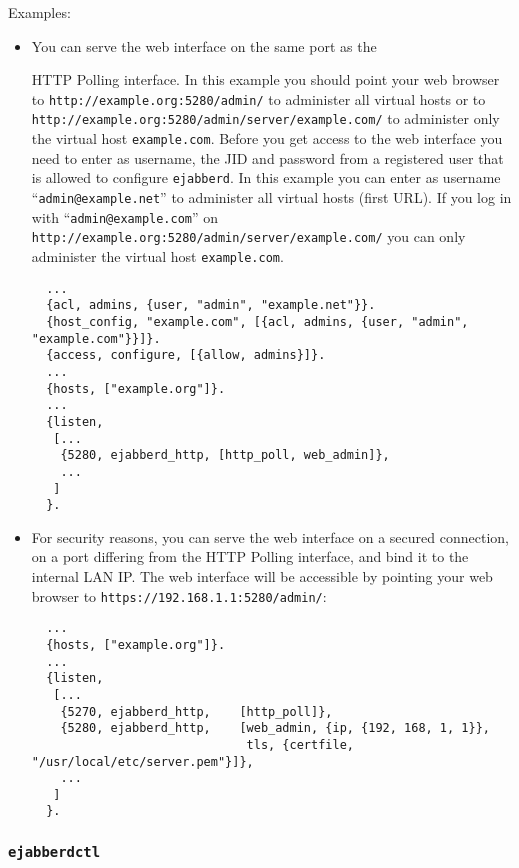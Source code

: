 \documentclass[a4paper,10pt]{article}
\newcommand{\ind}[1]{\begin{latexonly}\index{#1}\end{latexonly}}
\newcommand{\jid}[1]{\texttt{#1}}
\newcommand{\term}[1]{\texttt{#1}}
\newcommand{\ejabberd}{\texttt{ejabberd}}
\begin{document}
Examples:
\begin{itemize}
\item You can serve the web interface on the same port as the
  \ind{protocols!JEP-0025: HTTP Polling}HTTP Polling interface. In this example
  you should point your web browser to \verb|http://example.org:5280/admin/| to
  administer all virtual hosts or to
  \verb|http://example.org:5280/admin/server/example.com/| to administer only
  the virtual host \jid{example.com}. Before you get access to the web interface
  you need to enter as username, the JID and password from a registered user
  that is allowed to configure \ejabberd{}. In this example you can enter as
  username ``\jid{admin@example.net}'' to administer all virtual hosts (first
  URL). If you log in with ``\jid{admin@example.com}'' on \\
  \verb|http://example.org:5280/admin/server/example.com/| you can only
  administer the virtual host \jid{example.com}.
  \begin{verbatim}
  ...
  {acl, admins, {user, "admin", "example.net"}}.
  {host_config, "example.com", [{acl, admins, {user, "admin", "example.com"}}]}.
  {access, configure, [{allow, admins}]}.
  ...
  {hosts, ["example.org"]}.
  ...
  {listen,
   [...
    {5280, ejabberd_http, [http_poll, web_admin]},
    ...
   ]
  }.
\end{verbatim}
\item For security reasons, you can serve the web interface on a secured
  connection, on a port differing from the HTTP Polling interface, and bind it
  to the internal LAN IP. The web interface will be accessible by pointing your
  web browser to \verb|https://192.168.1.1:5280/admin/|:
  \begin{verbatim}
  ...
  {hosts, ["example.org"]}.
  ...
  {listen,
   [...
    {5270, ejabberd_http,    [http_poll]},
    {5280, ejabberd_http,    [web_admin, {ip, {192, 168, 1, 1}},
                              tls, {certfile, "/usr/local/etc/server.pem"}]},
    ...
   ]
  }.
\end{verbatim}
\end{itemize}

\subsubsection{\term{ejabberdctl}}
\label{sec:ejabberdctl}
\end{document}
